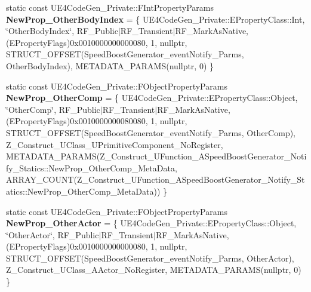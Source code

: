 \begin{DoxyCompactItemize}
static const U\+E4\+Code\+Gen\+\_\+\+Private\+::\+F\+Int\+Property\+Params {\bfseries New\+Prop\+\_\+\+Other\+Body\+Index} = \{ U\+E4\+Code\+Gen\+\_\+\+Private\+::\+E\+Property\+Class\+::\+Int, \char`\"{}Other\+Body\+Index\char`\"{}, R\+F\+\_\+\+Public$\vert$R\+F\+\_\+\+Transient$\vert$R\+F\+\_\+\+Mark\+As\+Native, (E\+Property\+Flags)0x0010000000000080, 1, nullptr, S\+T\+R\+U\+C\+T\+\_\+\+O\+F\+F\+S\+E\+T(\+Speed\+Boost\+Generator\+\_\+event\+Notify\+\_\+\+Parms, Other\+Body\+Index), M\+E\+T\+A\+D\+A\+T\+A\+\_\+\+P\+A\+R\+A\+M\+S(nullptr, 0) \}
\item 
\mbox{\label{struct_z___construct___u_function___a_speed_boost_generator___notify___statics_a71a2223b85c627b0da2d1fb6b0b4c872}} 
static const U\+E4\+Code\+Gen\+\_\+\+Private\+::\+F\+Object\+Property\+Params {\bfseries New\+Prop\+\_\+\+Other\+Comp} = \{ U\+E4\+Code\+Gen\+\_\+\+Private\+::\+E\+Property\+Class\+::\+Object, \char`\"{}Other\+Comp\char`\"{}, R\+F\+\_\+\+Public$\vert$R\+F\+\_\+\+Transient$\vert$R\+F\+\_\+\+Mark\+As\+Native, (E\+Property\+Flags)0x0010000000080080, 1, nullptr, S\+T\+R\+U\+C\+T\+\_\+\+O\+F\+F\+S\+E\+T(\+Speed\+Boost\+Generator\+\_\+event\+Notify\+\_\+\+Parms, Other\+Comp), Z\+\_\+\+Construct\+\_\+\+U\+Class\+\_\+\+U\+Primitive\+Component\+\_\+\+No\+Register, M\+E\+T\+A\+D\+A\+T\+A\+\_\+\+P\+A\+R\+A\+M\+S(\+Z\+\_\+\+Construct\+\_\+\+U\+Function\+\_\+\+A\+Speed\+Boost\+Generator\+\_\+\+Notify\+\_\+\+Statics\+::\+New\+Prop\+\_\+\+Other\+Comp\+\_\+\+Meta\+Data, A\+R\+R\+A\+Y\+\_\+\+C\+O\+U\+N\+T(\+Z\+\_\+\+Construct\+\_\+\+U\+Function\+\_\+\+A\+Speed\+Boost\+Generator\+\_\+\+Notify\+\_\+\+Statics\+::\+New\+Prop\+\_\+\+Other\+Comp\+\_\+\+Meta\+Data)) \}
\item 
\mbox{\label{struct_z___construct___u_function___a_speed_boost_generator___notify___statics_a97aac8fde1eecb09db5db1c1c4889933}} 
static const U\+E4\+Code\+Gen\+\_\+\+Private\+::\+F\+Object\+Property\+Params {\bfseries New\+Prop\+\_\+\+Other\+Actor} = \{ U\+E4\+Code\+Gen\+\_\+\+Private\+::\+E\+Property\+Class\+::\+Object, \char`\"{}Other\+Actor\char`\"{}, R\+F\+\_\+\+Public$\vert$R\+F\+\_\+\+Transient$\vert$R\+F\+\_\+\+Mark\+As\+Native, (E\+Property\+Flags)0x0010000000000080, 1, nullptr, S\+T\+R\+U\+C\+T\+\_\+\+O\+F\+F\+S\+E\+T(\+Speed\+Boost\+Generator\+\_\+event\+Notify\+\_\+\+Parms, Other\+Actor), Z\+\_\+\+Construct\+\_\+\+U\+Class\+\_\+\+A\+Actor\+\_\+\+No\+Register, M\+E\+T\+A\+D\+A\+T\+A\+\_\+\+P\+A\+R\+A\+M\+S(nullptr, 0) \}

\end{DoxyCompactItemize}
